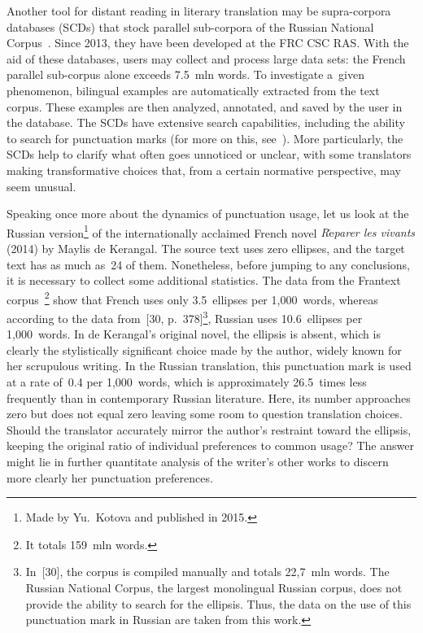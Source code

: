 \begin{multicols}{2}
    Another tool for distant reading in literary translation may be supra-corpora 
databases (SCDs) that stock parallel sub-corpora of the Russian National 
Corpus~\cite{28-nr}. Since 2013, they have been developed at the FRC CSC RAS. 
With the aid of these databases, users may collect and process large data sets: the 
French parallel sub-corpus alone exceeds 7.5~mln words. To investigate 
a~given phenomenon, bilingual examples are automatically extracted from the text 
corpus. These examples are then analyzed, annotated, and saved by the user in the 
database. The SCDs have extensive search capabilities, including the ability to 
search for punctuation marks (for more on this, see~\cite{26-nr, 27-nr}). More 
particularly, the SCDs help to clarify what often goes unnoticed or unclear, with 
some translators making transformative choices that, from a certain normative 
perspective, may seem unusual.

 Speaking once more about the dynamics of 
punctuation usage, let us look at the Russian version\footnote[3]{Made by 
Yu.~Kotova and published in 2015.} of the internationally acclaimed French novel 
\textit{R$\acute{\mbox{e}}$parer les vivants} (2014) by Maylis de Kerangal. The 
source text uses zero ellipses, and the target text has as much as~24 of them. 
Nonetheless, before jumping to any conclusions, it is necessary to collect some 
additional statistics. The data from the Frantext corpus~\cite{29-nr}\footnote[4]{It 
totals 159~mln words.} show that French uses only 3.5~ellipses per 
1,000~words, whereas according to the data from~[30, p.~378]\footnote[5]{In~[30], 
the corpus is compiled manually and totals 22,7~mln words. The Russian 
National Corpus, the largest monolingual Russian corpus, does not provide the 
ability to search for the ellipsis. Thus, the data on the use of this punctuation mark 
in Russian are taken from this work.}, Russian uses 10.6~ellipses per 
1,000~words. In de Kerangal's original novel, the ellipsis is absent, which is 
clearly the stylistically significant choice made by the author, widely known for 
her scrupulous writing. In the Russian translation, this punctuation mark is used at 
a rate of~0.4 per 1,000~words, which is approximately 26.5~times less frequently 
than in contemporary Russian literature. Here, its number approaches zero but 
does not equal zero leaving some room to question translation choices. Should the 
translator accurately mirror the author's restraint toward the ellipsis, keeping the 
original ratio of individual preferences to common usage? The answer might lie in 
further quantitate analysis of the writer's other works to discern more clearly her 
punctuation preferences.
    

\end{multicols}
